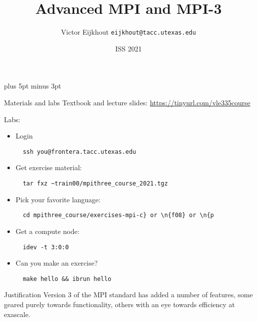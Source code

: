 \documentclass[11pt,headernav]{beamer}
\newcounter{tacc}
\def\Location{}%
\def\courseyear{2021}
\def\Location{TACC APP institute MPI training \courseyear}
\def\Location{TACC/XSEDE MPI training \courseyear}
\def\Location{PEARC2020\\
  \url{http://tinyurl.com/tacc-pearc-2020}\\
  \texttt{\char126 train00/mpithree\_course\_2020.tgz}
}
\def\Location{ISS 2021}
\newcounter{mpithree}
\begin{document}
\parskip=10pt plus 5pt minus 3pt

\title{Advanced MPI and MPI-3}
\author{Victor Eijkhout {\tt eijkhout@tacc.utexas.edu}}
\date{\Location}

\begin{frame}
  \titlepage
\end{frame}

\begin{xsede}
  
\end{xsede}

\begin{frame}[containsverbatim]{Materials and labs}
   Textbook and lecture slides: \url{https://tinyurl.com/vle335course}

  Labs:
  \begin{itemize}
  \item Login
\begin{verbatim}
  ssh you@frontera.tacc.utexas.edu
\end{verbatim}

\item Get exercise material:\\
\begin{verbatim}
  tar fxz ~train00/mpithree_course_2021.tgz
\end{verbatim}

\item Pick your favorite language:\\
\begin{verbatim}
  cd mpithree_course/exercises-mpi-c} or \n{f08} or \n{p
\end{verbatim}

\item Get a compute node:
\begin{verbatim}
  idev -t 3:0:0
\end{verbatim}

\item Can you make an exercise?\\
\begin{verbatim}
  make hello && ibrun hello
\end{verbatim}

  \end{itemize}
\end{frame}

\begin{frame}{Justification}
  Version 3 of the MPI standard has added a number
  of features, some geared purely towards functionality,
  others with an eye towards efficiency at exascale.
\end{frame}
\end{document}
